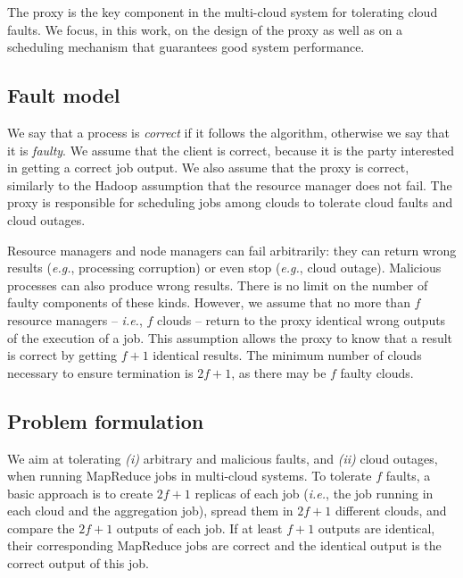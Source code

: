 \documentclass[10pt, conference, compsocconf]{IEEEtran}
\begin{document}
The proxy is the key component in the multi-cloud system for tolerating cloud faults. We focus, in this work, on the design of the proxy as well as on a scheduling mechanism that guarantees good system performance.

\subsection{Fault model}
\label{sec:problem:faultmodel}

We say that a process is \emph{correct} if it follows the algorithm, otherwise we say that it is \emph{faulty}.
We assume that the client is correct, because it is the party interested in getting a correct job output.
We also assume that the proxy is correct, similarly to the Hadoop assumption that the resource manager does not fail.
The proxy is responsible for scheduling jobs among clouds to tolerate cloud faults and cloud outages.

Resource managers and node managers can fail arbitrarily: they can return wrong results (\textit{e.g.}, processing corruption) or even stop (\textit{e.g.}, cloud outage).
Malicious processes can also produce wrong results.
There is no limit on the number of faulty components of these kinds.
However, we assume that no more than $f$ resource managers -- \textit{i.e.}, $f$ clouds -- return to the proxy identical wrong outputs of the execution of a job.
This assumption allows the proxy to know that a result is correct by getting $f+1$ identical results.
The minimum number of clouds necessary to ensure termination is $2f+1$, as there may be $f$ faulty clouds.

\subsection{Problem formulation}
\label{sec:problem:statement:problem:definition}

We aim at tolerating \textit{(i)} arbitrary and malicious faults, and \textit{(ii)} cloud outages, when running MapReduce jobs in multi-cloud systems. To tolerate $f$ faults, a basic approach is to create $2f+1$ replicas of each job (\textit{i.e.}, the job running in each cloud and the aggregation job), spread them in $2f+1$ different clouds, and compare the $2f+1$ outputs of each job. If at least $f+1$ outputs are identical, their corresponding MapReduce jobs are correct and the identical output is the correct output of this job.
\end{document}
